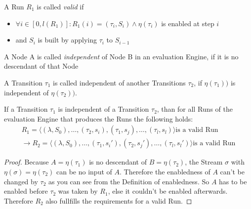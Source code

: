 \begin{definition}[name = Valid Run]\label{def:valid_run}
  A Run \(R_1\) is called \emph{valid} if
  \begin{itemize}
    \item \(\forall i \in [0,l(R_1)]: R_1(i) = (\tau_i,S_i) \land \eta(\tau_i)\) is enabled at step \(i\)
    \item and \(S_i\) is built by applying \(\tau_i\) to \(S_{i-1}\)
  \end{itemize}
\end{definition}

\begin{definition}[name = Independence of Nodes]\label{def:node_independent}
  A Node A is called \emph{independent} of Node B in an evaluation Engine, if it is no descendant of that Node
\end{definition}

\begin{definition}[name = Independence of Transitions]\label{def:independence_transitions}
  A Transition \(\tau_1\) is called independent of another Transitions \(\tau_2\), if \(\eta(\tau_1))\) is independent of \(\eta(\tau_2))\).
\end{definition}

\begin{lemma}[name = Exchange of independent Transitions]\label{lemma:exchange_independent_transitions}
  If a Transition \(\tau_1\) is independent of a Transition \(\tau_2\), than for all Runs of the evaluation Engine that produces the Runs the following holds:
  \begin{align*}
    R_1 = \langle (\lambda, S_0), \dots, (\tau_2, s_i), (\tau_1, s_j), \dots, (\tau_l, s_l) \rangle \text{is a valid Run} \\
    \rightarrow R_2 = \langle (\lambda, S_0), \dots, (\tau_1, s_i'), (\tau_2, s_j'), \dots, (\tau_l, s_l') \rangle \text{is a valid Run}
  \end{align*}
\end{lemma}

\begin{proof}
  Because \(A = \eta(\tau_1)\) is no descendant of \(B = \eta(\tau_2)\), the Stream \(\sigma\) with \(\eta(\sigma) = \eta(\tau_2)\) can be no input of \(A\).
  Therefore the enabledness of \(A\) can't be changed by \(\tau_2\) as you can see from the Definition of enabledness.
  So \(A\) has to be enabled before \(\tau_2\) was taken by \(R_1\), else it couldn't be enabled afterwards.
  Therefore \(R_2\) also fullfills the requirements for a valid Run.
\end{proof}

